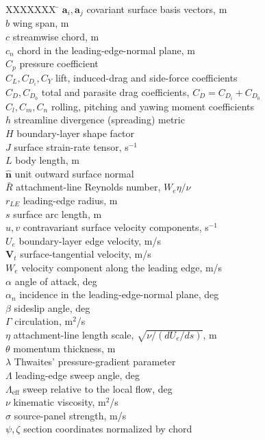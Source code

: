 \documentclass[submit]{aiaa-tc}%
\newcommand{\Rbar}{\bar{R}}
\begin{document}
\begin{tabbing}
  XXXXXXX \= \kill
  $\mathbf{a}_i, \mathbf{a}_j$ \> covariant surface basis vectors, m \\
  $b$ \> wing span, m \\
  $c$ \> streamwise chord, m \\
  $c_n$ \> chord in the leading-edge-normal plane, m \\
  $C_p$ \> pressure coefficient \\
  $C_L, C_{D_i}, C_Y$ \> lift, induced-drag and side-force coefficients \\
  $C_D, C_{D_0}$ \> total and parasite drag coefficients,
    $C_D = C_{D_i} + C_{D_0}$ \\
  $C_l, C_m, C_n$ \> rolling, pitching and yawing moment coefficients \\
  $h$ \> streamline divergence (spreading) metric \\
  $H$ \> boundary-layer shape factor \\
  $J$ \> surface strain-rate tensor, s$^{-1}$ \\
  $L$ \> body length, m \\
  $\hat{\mathbf{n}}$ \> unit outward surface normal \\
  $\Rbar$ \> attachment-line Reynolds number, $W_e \eta / \nu$ \\
  $r_{LE}$ \> leading-edge radius, m \\
  $s$ \> surface arc length, m \\
  $u, v$ \> contravariant surface velocity components, s$^{-1}$ \\
  $U_e$ \> boundary-layer edge velocity, m/s \\
  $\mathbf{V}_t$ \> surface-tangential velocity, m/s \\
  $W_e$ \> velocity component along the leading edge, m/s \\
  $\alpha$ \> angle of attack, deg \\
  $\alpha_n$ \> incidence in the leading-edge-normal plane, deg \\
  $\beta$ \> sideslip angle, deg \\
  $\Gamma$ \> circulation, m$^2$/s \\
  $\eta$ \> attachment-line length scale, $\sqrt{\nu/(dU_e/ds)}$, m \\
  $\theta$ \> momentum thickness, m \\
  $\lambda$ \> Thwaites' pressure-gradient parameter \\
  $\Lambda$ \> leading-edge sweep angle, deg \\
  $\Lambda_{\text{eff}}$ \> sweep relative to the local flow, deg \\
  $\nu$ \> kinematic viscosity, m$^2$/s \\
  $\sigma$ \> source-panel strength, m/s \\
  $\psi, \zeta$ \> section coordinates normalized by chord \\
\end{tabbing}
\end{document}
